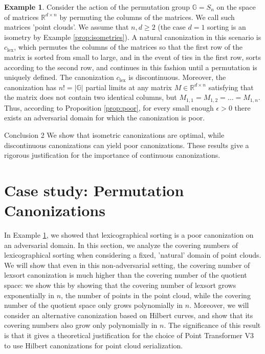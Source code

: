 \documentclass{article}
\theoremstyle{definition}
\newtheorem{example}[definition]{Example}
\theoremstyle{plain}
\newcommand{\G}{\mathbb{G}}
\newcommand{\RR}{\mathbb{R}}
\newcommand{\csort}{c_{\mathrm{lex}}}
\begin{document}

\begin{example}\label{ex:multisort}
Consider the action of the permutation group $\G=S_n$ on the space of matrices $\RR^{d\times n} $ by permuting the columns of the matrices. We call such matrices 'point clouds'. We assume that $n,d\geq 2$ (the case $d=1$ sorting is an isometry by Example \ref{prop:isometries}). A natural canonization in this scenario is $\csort$, which permutes the columns of the matrices so that the first row of the matrix is sorted from small to large, and in the event of ties in the first row, sorts according to the second row, and continues in this fashion until a permutation is uniquely defined. The canonization $\csort$ is discontinuous. Moreover, the canonization has $n!=|\G|$ partial limits at any matrix  $M\in \RR^{d \times n} $ satisfying that the matrix does not contain two identical columns, but $M_{1,1}=M_{1,2}=\ldots=M_{1,n} $. Thus, according to Proposition \ref{prop:poor}, for every small enough $\epsilon>0$ there exists an adversarial domain for which the canonization is poor. 
\end{example}
\begin{conclusionbox}{Conclusion 2}
We show that isometric canonizations are optimal, while discontinuous canonizations can yield poor canonizations. These results give a rigorous justification for the importance of continuous canonizations.
\end{conclusionbox}


\section{Case study: Permutation Canonizations}\label{sec:case_study}

In Example \ref{ex:multisort}, we showed that lexicographical sorting is a poor canonization on an adversarial domain. In this section, we analyze the covering numbers of lexicographical sorting when considering a fixed, 'natural' domain of point clouds. We will show that even in this non-adversarial setting, the covering number of lexsort canonization is much higher than the covering number of the quotient space: we show this by showing that the covering number of lexsort grows exponentially in $n$, the number of points in the point cloud, while the covering number of the quotient space only grows polynomially in $n$.   Moreover, we will consider an alternative canonization based on Hilbert curves, and show that its covering numbers also grow only polynomially in $n$. The significance of this result is that it gives a theoretical justification for the choice of  Point Transformer V3 \cite{wu2024ptv3} to use Hilbert canonizations for point cloud serialization.  
\end{document}
